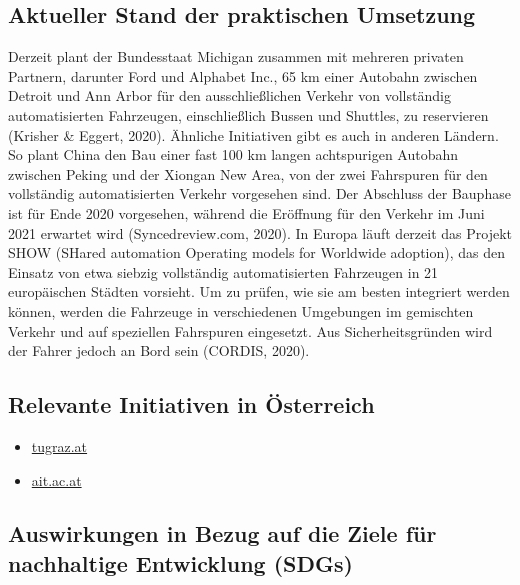 \documentclass[
]{book}
\providecommand{\tightlist}{%
  \setlength{\itemsep}{0pt}\setlength{\parskip}{0pt}}
\begin{document}
\hypertarget{aktueller-stand-der-praktischen-umsetzung}{%
\subsection*{Aktueller Stand der praktischen Umsetzung}\label{aktueller-stand-der-praktischen-umsetzung}}

Derzeit plant der Bundesstaat Michigan zusammen mit mehreren privaten Partnern, darunter Ford und Alphabet Inc., 65 km einer Autobahn zwischen Detroit und Ann Arbor für den ausschließlichen Verkehr von vollständig automatisierten Fahrzeugen, einschließlich Bussen und Shuttles, zu reservieren (Krisher \& Eggert, 2020). Ähnliche Initiativen gibt es auch in anderen Ländern. So plant China den Bau einer fast 100 km langen achtspurigen Autobahn zwischen Peking und der Xiongan New Area, von der zwei Fahrspuren für den vollständig automatisierten Verkehr vorgesehen sind. Der Abschluss der Bauphase ist für Ende 2020 vorgesehen, während die Eröffnung für den Verkehr im Juni 2021 erwartet wird (Syncedreview.com, 2020). In Europa läuft derzeit das Projekt SHOW (SHared automation Operating models for Worldwide adoption), das den Einsatz von etwa siebzig vollständig automatisierten Fahrzeugen in 21 europäischen Städten vorsieht. Um zu prüfen, wie sie am besten integriert werden können, werden die Fahrzeuge in verschiedenen Umgebungen im gemischten Verkehr und auf speziellen Fahrspuren eingesetzt. Aus Sicherheitsgründen wird der Fahrer jedoch an Bord sein (CORDIS, 2020).

\hypertarget{relevante-initiativen-in-uxf6sterreich}{%
\subsection*{Relevante Initiativen in Österreich}\label{relevante-initiativen-in-uxf6sterreich}}

\begin{itemize}
\tightlist
\item
  \href{https://www.tugraz.at/fileadmin/user_upload/Institute/IHF/Projekte/ENABLE-S3_SummaryofResults_May2019.pdf}{tugraz.at}
\item
  \href{https://www.ait.ac.at/themen/verkehrssicherheit-und-unfallforschung/projects/via-autonom/}{ait.ac.at}
\end{itemize}

\hypertarget{auswirkungen-in-bezug-auf-die-ziele-fuxfcr-nachhaltige-entwicklung-sdgs}{%
\subsection*{Auswirkungen in Bezug auf die Ziele für nachhaltige Entwicklung (SDGs)}\label{auswirkungen-in-bezug-auf-die-ziele-fuxfcr-nachhaltige-entwicklung-sdgs}}
\end{document}
